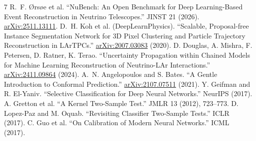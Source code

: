 \documentclass[10pt,twocolumn]{extarticle}
\begin{document}
\begin{thebibliography}{7}
\scriptsize
\setlength{\itemsep}{-1.6pt}\setlength{\parsep}{0pt}
 R.~F. \O rs\o e et al. ``NuBench: An Open Benchmark for Deep
Learning-Based Event Reconstruction in Neutrino Telescopes.'' JINST 21 (2026).
\href{https://arxiv.org/abs/2511.13111}{arXiv:2511.13111}.
 D.~H. Koh et al. (DeepLearnPhysics). ``Scalable,
Proposal-free Instance Segmentation Network for 3D Pixel Clustering and
Particle Trajectory Reconstruction in LArTPCs.''
\href{https://arxiv.org/abs/2007.03083}{arXiv:2007.03083} (2020).
 D. Douglas, A. Mishra, F. Petersen, D. Ratner,
K. Terao. ``Uncertainty Propagation within Chained Models for Machine Learning
Reconstruction of Neutrino-LAr Interactions.''
\href{https://arxiv.org/abs/2411.09864}{arXiv:2411.09864} (2024).
 A.~N. Angelopoulos and S. Bates. ``A Gentle
Introduction to Conformal Prediction.''
\href{https://arxiv.org/abs/2107.07511}{arXiv:2107.07511} (2021).
 Y. Geifman and R. El-Yaniv. ``Selective Classification
for Deep Neural Networks.'' NeurIPS (2017).
 A. Gretton et al. ``A Kernel Two-Sample Test.'' JMLR 13
(2012), 723--773.
 D. Lopez-Paz and M. Oquab. ``Revisiting Classifier
Two-Sample Tests.'' ICLR (2017).
 C. Guo et al. ``On Calibration of Modern Neural Networks.''
ICML (2017).
\end{thebibliography}
\end{document}
